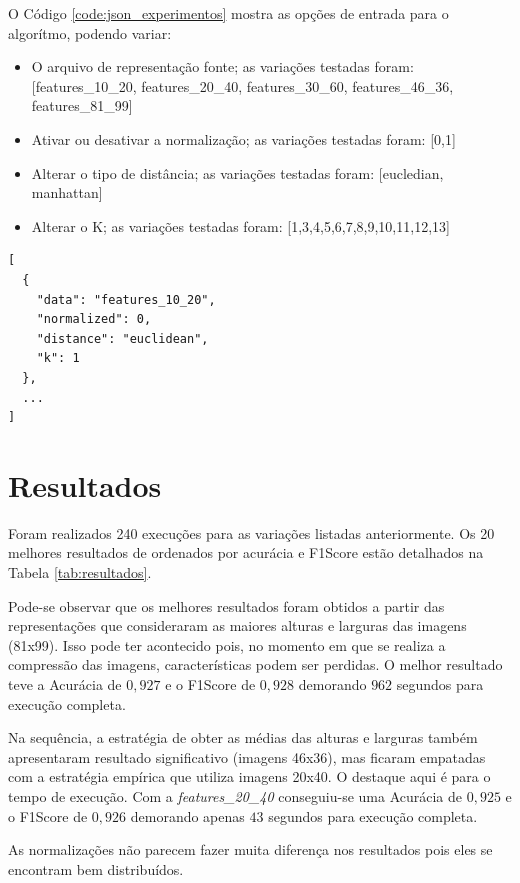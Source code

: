 \documentclass[9pt,twocolumn]{article}
\begin{document}
O Código \ref{code:json_experimentos} mostra as opções de entrada para o algorítmo, podendo variar:

\begin{itemize}
  \item O arquivo de representação fonte; as variações testadas foram: [features\_10\_20, features\_20\_40, features\_30\_60, features\_46\_36, features\_81\_99]
  \item Ativar ou desativar a normalização; as variações testadas foram: [0,1]
  \item Alterar o tipo de distância; as variações testadas foram: [eucledian, manhattan]
  \item Alterar o K; as variações testadas foram: [1,3,4,5,6,7,8,9,10,11,12,13]
\end{itemize}

\begin{lstlisting}[caption={JSON para experimentos},captionpos=b,frame=single,label={code:json_experimentos}]
[
  {
    "data": "features_10_20",
    "normalized": 0,
    "distance": "euclidean",
    "k": 1
  },
  ...
]
\end{lstlisting}

\section{Resultados}

Foram realizados 240 execuções para as variações listadas anteriormente. Os 20 melhores resultados de ordenados por acurácia e F1Score estão detalhados na Tabela \ref{tab:resultados}.

Pode-se observar que os melhores resultados foram obtidos a partir das representações que consideraram as maiores alturas e larguras das imagens (81x99). Isso pode ter acontecido pois, no momento em que se realiza a compressão das imagens, características podem ser perdidas. O melhor resultado teve a Acurácia de $0,927$ e o F1Score de $0,928$ demorando $962$ segundos para execução completa.

Na sequência, a estratégia de obter as médias das alturas e larguras também apresentaram resultado significativo (imagens 46x36), mas ficaram empatadas com a estratégia empírica que utiliza imagens 20x40. O destaque aqui é para o tempo de execução. Com a \textit{features\_20\_40} conseguiu-se uma Acurácia de $0,925$ e o F1Score de $0,926$ demorando apenas $43$ segundos para execução completa.

As normalizações não parecem fazer muita diferença nos resultados pois eles se encontram bem distribuídos.
\end{document}
